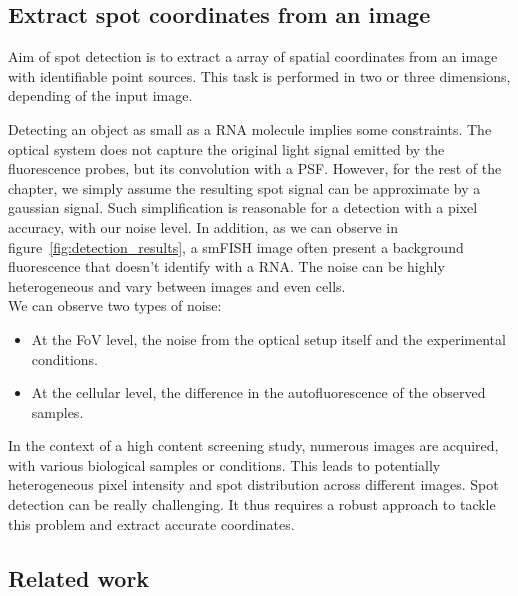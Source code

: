 \subsection{Extract spot coordinates from an image} \label{subsec:detection}

Aim of spot detection is to extract a array of spatial coordinates from an image with identifiable point sources.
This task is performed in two or three dimensions, depending of the input image.

Detecting an object as small as a \ac{RNA} molecule implies some constraints.
The optical system does not capture the original light signal emitted by the fluorescence probes, but its convolution with a \ac{PSF}.
However, for the rest of the chapter, we simply assume the resulting spot signal can be approximate by a gaussian signal.
Such simplification is reasonable for a detection with a pixel accuracy, with our noise level.
In addition, as we can observe in figure~\ref{fig:detection_results}, a \ac{smFISH} image often present a background fluorescence that doesn't identify with a \ac{RNA}.
The noise can be highly heterogeneous and vary between images and even cells.\\

\noindent
We can observe two types of noise:
\begin{itemize}
	\item At the \ac{FoV} level, the noise from the optical setup itself and the experimental conditions.
	\item At the cellular level, the difference in the autofluorescence of the observed samples.
\end{itemize}

In the context of a high content screening study, numerous images are acquired, with various biological samples or conditions.
This leads to potentially heterogeneous pixel intensity and spot distribution across different images.
Spot detection can be really challenging.
It thus requires a robust approach to tackle this problem and extract accurate coordinates.

\subsection{Related work} \label{subsec:detection_related_work}


